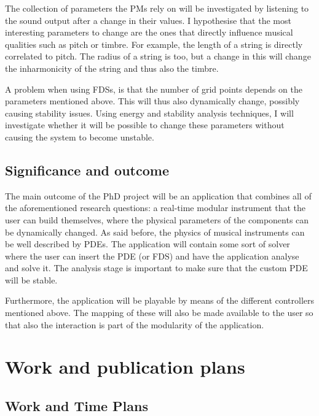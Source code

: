 The collection of parameters the PMs rely on will be investigated by listening to the sound output after a change in their values. I hypothesise that the most interesting parameters to change are the ones that directly influence musical qualities such as pitch or timbre. For example, the length of a string is directly correlated to pitch. The radius of a string is too, but a change in this will change the inharmonicity of the string and thus also the timbre.

A problem when using FDSs, is that the number of grid points depends on the parameters mentioned above. This will thus also dynamically change, possibly causing stability issues. Using energy and stability analysis techniques, I will investigate whether it will be possible to change these parameters without causing the system to become unstable.

\subsection{Significance and outcome}

The main outcome of the PhD project will be an application that combines all of the aforementioned research questions: a real-time modular instrument that the user can build themselves, where the physical parameters of the components can be dynamically changed. As said before, the physics of musical instruments can be well described by PDEs. The application will contain some sort of solver where the user can insert the PDE (or FDS) and have the application analyse and solve it. The analysis stage is important to make sure that the custom PDE will be stable. 

Furthermore, the application will be playable by means of the different controllers mentioned above. The mapping of these will also be made available to the user so that also the interaction is part of the modularity of the application.

\section{Work and publication plans}
\subsection{Work and Time Plans}

